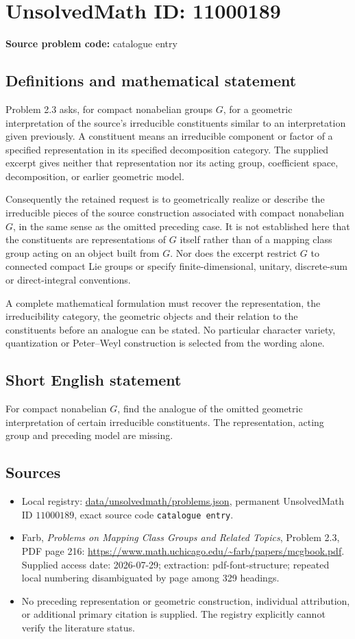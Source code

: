 \documentclass[11pt]{article}
\begin{document}
\section*{UnsolvedMath ID: 11000189}
\textbf{Source problem code:} catalogue entry
\subsection{Definitions and mathematical statement}
Problem 2.3 asks, for compact nonabelian groups $G$, for a geometric interpretation of the source's irreducible constituents similar to an interpretation given previously. A constituent means an irreducible component or factor of a specified representation in its specified decomposition category. The supplied excerpt gives neither that representation nor its acting group, coefficient space, decomposition, or earlier geometric model.

Consequently the retained request is to geometrically realize or describe the irreducible pieces of the source construction associated with compact nonabelian $G$, in the same sense as the omitted preceding case. It is not established here that the constituents are representations of $G$ itself rather than of a mapping class group acting on an object built from $G$. Nor does the excerpt restrict $G$ to connected compact Lie groups or specify finite-dimensional, unitary, discrete-sum or direct-integral conventions.

A complete mathematical formulation must recover the representation, the irreducibility category, the geometric objects and their relation to the constituents before an analogue can be stated. No particular character variety, quantization or Peter--Weyl construction is selected from the wording alone.
\subsection{Short English statement}
For compact nonabelian $G$, find the analogue of the omitted geometric interpretation of certain irreducible constituents. The representation, acting group and preceding model are missing.
\subsection{Sources}
\begin{itemize}
\item Local registry: \url{data/unsolvedmath/problems.json}, permanent UnsolvedMath ID $11000189$, exact source code \texttt{catalogue entry}.
\item Farb, \emph{Problems on Mapping Class Groups and Related Topics}, Problem 2.3, PDF page 216: \url{https://www.math.uchicago.edu/~farb/papers/mcgbook.pdf}. Supplied access date: 2026-07-29; extraction: pdf-font-structure; repeated local numbering disambiguated by page among 329 headings.
\item No preceding representation or geometric construction, individual attribution, or additional primary citation is supplied. The registry explicitly cannot verify the literature status.
\end{itemize}
\end{document}
